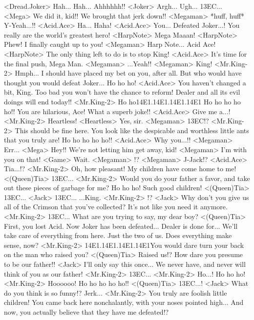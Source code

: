 <Dread.Joker> Hah... 
Hah... Ahhhhhh!! 
<Joker> Argh... Ugh... 
{13}{EC}... 
<Mega> We did it, kid!! 
We brought that jerk down!! 
<Megaman> *huff, huff* 
Y-Yeah...!! 
<Acid.Ace> Ha... Haha! 
<Acid.Ace> You... Defeated Joker...! 
You really are the world's greatest hero! 
<HarpNote> Mega Maaan! 
<HarpNote> Phew! I finally caught up to you! 
<Megaman> Harp Note... 
Acid Ace! 
<HarpNote> The only thing left to do is to stop King! 
<Acid.Ace> It's time for the final push, Mega Man. 
<Megaman> ...Yeah!! 
<Megaman> King! 
<Mr.King-2> Hmph... 
I should have placed my bet on you, after all. 
But who would have thought you would defeat Joker... 
Ho ho ho! 
<Acid.Ace> You haven't changed a bit, King. 
Too bad you won't have the chance to reform! 
Dealer and all its evil doings will end today!! 
<Mr.King-2> Ho ho{14}{E1}.{14}{E1}.{14}{E1}.{14}{E1} 
Ho ho ho ho ho!! 
You are hilarious, Ace! What a superb joke!! 
<Acid.Ace> Give me a...! 
<Mr.King-2> Heartless! 
<Heartless> Yes, sir. 
<Megaman> {13}{EC}!? 
<Mr.King-2> This should be fine here. 
You look like the despicable and worthless little ants that you truly are! 
Ho ho ho ho ho!! 
<Acid.Ace> Why you...!! 
<Megaman> Err... 
<Mega> Hey!! We're not letting him get away, kid! 
<Megaman> I'm with you on that! 
<Game> Wait. 
<Megaman> !? 
<Megaman> J-Jack!? 
<Acid.Ace> Tia...!? 
<Mr.King-2> Oh, how pleasant! 
My children have come home to me! 
<(Queen)Tia> {13}{EC}... 
<Mr.King-2> Would you do your father a favor, and take out these pieces of garbage for me? 
Ho ho ho! Such good children! 
<(Queen)Tia> {13}{EC}... 
<Jack> {13}{EC}... 
...King. 
<Mr.King-2> !? 
<Jack> Why don't you give us all of the Crimson that you've collected? 
It's not like you need it anymore. 
<Mr.King-2> {13}{EC}... 
What are you trying to say, my dear boy? 
<(Queen)Tia> First, you lost Acid. Now Joker has been defeated... 
Dealer is done for... 
We'll take care of everything from here. Just the two of us. 
Does everything make sense, now? 
<Mr.King-2> {14}{E1}.{14}{E1}.{14}{E1}.{14}{E1}You would dare turn your back on the man who raised you? 
<(Queen)Tia> Raised us!? How dare you presume to be our father!! 
<Jack> I'll only say this once... 
We never have, and never will think of you as our father! 
<Mr.King-2> {13}{EC}... 
<Mr.King-2> Ho...! 
Ho ho ho! 
<Mr.King-2> Hoooooo! Ho ho ho ho ho!! 
<(Queen)Tia> {13}{EC}...! 
<Jack> What do you think is so funny!? Jerk... 
<Mr.King-2> You truly are foolish little children! 
You came back here nonchalantly, with your noses pointed high... 
And now, you actually believe that they have me defeated!? 
